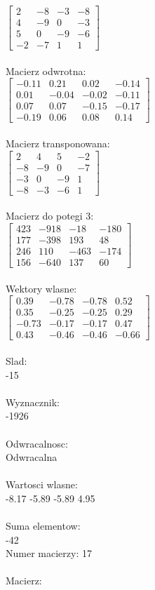 \documentclass[a4paper,12pt]{article}
\begin{document}
$\begin{bmatrix} 2&-8&-3&-8\\4&-9&0&-3\\5&0&-9&-6\\-2&-7&1&1 \end{bmatrix}$
\\
\\
Macierz odwrotna:\\

$\begin{bmatrix} -0.11&0.21&0.02&-0.14\\0.01&-0.04&-0.02&-0.11\\0.07&0.07&-0.15&-0.17\\-0.19&0.06&0.08&0.14 \end{bmatrix}$
\\
\\
Macierz transponowana:\\

$\begin{bmatrix} 2&4&5&-2\\-8&-9&0&-7\\-3&0&-9&1\\-8&-3&-6&1 \end{bmatrix}$
\\
\\
Macierz do potegi 3:\\

$\begin{bmatrix} 423&-918&-18&-180\\177&-398&193&48\\246&110&-463&-174\\156&-640&137&60 \end{bmatrix}$
\\
\\
Wektory wlasne:\\

$\begin{bmatrix} 0.39&-0.78&-0.78&0.52\\0.35&-0.25&-0.25&0.29\\-0.73&-0.17&-0.17&0.47\\0.43&-0.46&-0.46&-0.66 \end{bmatrix}$
\\
\\
Slad:\\
-15
\\
\\
Wyznacznik:\\
-1926
\\
\\
Odwracalnosc:\\
Odwracalna
\\
\\
Wartosci wlasne:\\
-8.17 -5.89 -5.89 4.95
\\
\\
Suma elementow:\\
-42
\\
\newpage
Numer macierzy:
17
\\
\\
Macierz:\\
\end{document}
